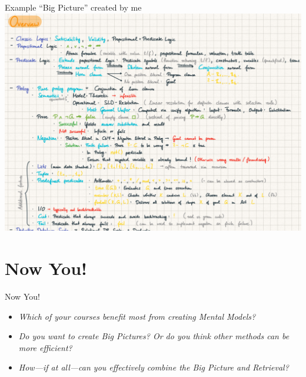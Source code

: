 \documentclass{ercisbeamer}
\begin{document}
\begin{frame}{Example ``Big Picture'' created by me}
    \centering \includegraphics[height=.83\paperheight]{10_resources/big_picture_lsp_example.png}
\end{frame}

\section{Now You!}
\begin{frame}{Now You!}
    \begin{itemize}
        \item \emph{Which of your courses benefit most from creating Mental Models?}
        \item \emph{Do you want to create Big Pictures? Or do you think other methods can be more efficient?}
        \item \emph{How---if at all---can you effectively combine the Big Picture and Retrieval?}
    \end{itemize}
\end{frame}



\sources
\end{document}
